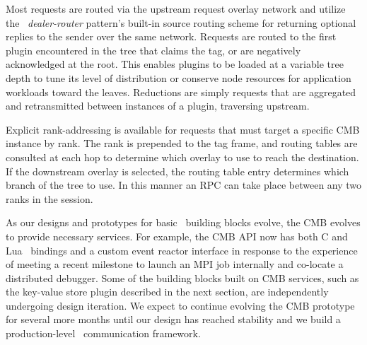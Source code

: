 Most requests are routed via the upstream request overlay network
and utilize the \zMQ\ {\em dealer-router} pattern's built-in source routing
scheme for returning optional replies to the sender over the same network.
Requests are routed to the first plugin encountered in the tree that claims
the tag, or are negatively acknowledged at the root.  This enables plugins
to be loaded at a variable tree depth to tune its level of distribution
or conserve node resources for application workloads toward the leaves.
Reductions are simply requests that are aggregated and retransmitted between
instances of a plugin, traversing upstream.

Explicit rank-addressing is available for requests that must target a
specific CMB instance by rank.  The rank is prepended to the tag frame,
and routing tables are consulted at each hop to determine which overlay
to use to reach the destination.  If the downstream overlay is selected,
the routing table entry determines which branch of the tree to use.
In this manner an RPC can take place between any two ranks in the session.

As our designs and prototypes for basic \flux\ building blocks evolve,
the CMB evolves to provide necessary services.  For example, the CMB API
now has both C and Lua~\cite{LuaBook}  bindings and a custom event reactor interface in
response to the experience of meeting a recent milestone to launch an
MPI job internally and co-locate a distributed debugger.  Some of the building
blocks built on CMB services, such as the key-value store plugin described
in the next section, are independently undergoing design iteration.
We expect to continue evolving the CMB prototype for several more months until
our design has reached stability and we build a production-level \flux\ 
communication framework.
